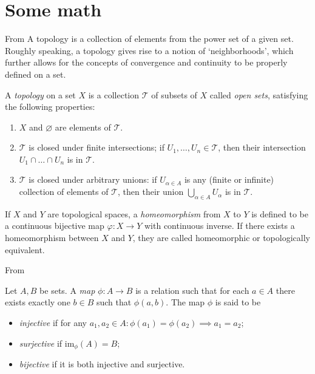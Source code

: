 %
\chapter{Some math}
From \cite{Lee2000}
A topology is a collection of elements from the power set of a given set. Roughly speaking, a topology gives rise to a notion of `neighborhoods', which further allows for the concepts of convergence and continuity to be properly defined on a set.
\begin{definition}[Topology]
    A \emph{topology} on a set $X$ is a collection $\mathscr{T}$ of subsets of $X$ called \emph{open sets}, satisfying the following properties:
    \begin{enumerate}[label=\roman*]
        \item $X$ and $\varnothing$ are elements of $\mathscr{T}$.
        \item $\mathscr{T}$ is closed under finite intersections; if $U_1,\ldots,U_n \in \mathscr{T}$, then their intersection $U_1 \cap \ldots \cap U_n$ is in $\mathscr{T}$.
            \item $\mathscr{T}$ is closed under arbitrary unions: if $U_{\alpha \in A}$ is any (finite or infinite) collection of elements of $\mathscr{T}$, then their union $\displaystyle\bigcup_{\alpha \in A}  U_\alpha$ is in $\mathscr{T}$.
    \end{enumerate}
\end{definition}
\begin{definition}[Homeomorphism]
    If $X$ and $Y$ are topological spaces, a \emph{homeomorphism} from $X$ to $Y$ is defined to be a continuous bijective map $\varphi: X\to Y$ with continuous inverse. If there exists a homeomorphism between $X$ and $Y$, they are called homeomorphic or topologically equivalent.
\end{definition}

From \cite{Schuller2014}
\begin{definition}[Mapping]
    Let \(A, B\) be sets. A \emph{map} \(\phi: A \to B\) is a relation such that for each \( a \in A\) there exists exactly one \( b \in B\) such that \(\phi(a, b)\). The map \(\phi\) is said to be 
    \begin{itemize}
        \item \emph{injective} if for any \(a_1, a_2 \in A: \phi(a_1) = \phi(a_2) \implies a_1 = a_2\);
        \item \emph{surjective} if \(\mathrm{im}_\phi(A) = B\);
        \item \emph{bijective} if it is both injective and surjective.
    \end{itemize}
\end{definition}

